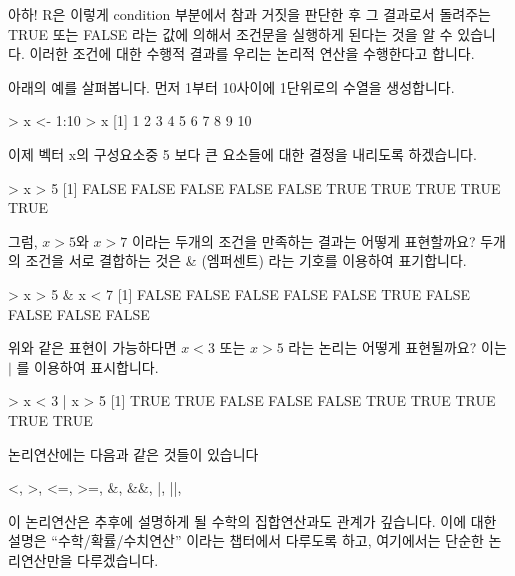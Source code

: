 아하! R은 이렇게 condition 부분에서 참과 거짓을 판단한 후 그 결과로서 돌려주는 TRUE 또는 FALSE 라는 값에 의해서 조건문을 실행하게 된다는 것을 알 수 있습니다. 
이러한 조건에 대한 수행적 결과를 우리는 논리적 연산을 수행한다고 합니다. 

아래의 예를 살펴봅니다.
먼저 1부터 10사이에 1단위로의 수열을 생성합니다.

\begin{Schunk}
\begin{Soutput}
> x <- 1:10
> x
 [1]  1  2  3  4  5  6  7  8  9 10
\end{Soutput}
\end{Schunk}

이제 벡터 x의 구성요소중 5 보다 큰 요소들에 대한 결정을 내리도록 하겠습니다. 

\begin{Schunk}
\begin{Soutput}
> x > 5
 [1] FALSE FALSE FALSE FALSE FALSE  TRUE  TRUE  TRUE  TRUE  TRUE
\end{Soutput}
\end{Schunk}

그럼, $x>5$와  $x>7$ 이라는 두개의 조건을 만족하는 결과는 어떻게 표현할까요?
두개의 조건을 서로 결합하는 것은 \& (엠퍼센트) 라는 기호를 이용하여 표기합니다. 
 
\begin{Schunk}
\begin{Soutput}
> x > 5 & x < 7
 [1] FALSE FALSE FALSE FALSE FALSE  TRUE FALSE FALSE FALSE FALSE
\end{Soutput}
\end{Schunk}

위와 같은 표현이 가능하다면 $x<3$ 또는 $x>5$ 라는 논리는 어떻게 표현될까요? 
이는 $|$ 를 이용하여 표시합니다. 

\begin{Schunk}
\begin{Soutput}
> x < 3 | x > 5
 [1]  TRUE  TRUE FALSE FALSE FALSE  TRUE  TRUE  TRUE  TRUE  TRUE
\end{Soutput}
\end{Schunk}

논리연산에는 다음과 같은 것들이 있습니다
\begin{Schunk}
\begin{Soutput}
<, >, <=, >=, &, &&, |, ||, 
\end{Soutput}
\end{Schunk}

이 논리연산은 추후에 설명하게 될 수학의 집합연산과도 관계가 깊습니다. 
이에 대한 설명은 ``수학/확률/수치연산'' 이라는 챕터에서 다루도록 하고, 여기에서는 단순한 논리연산만을 다루겠습니다. 


